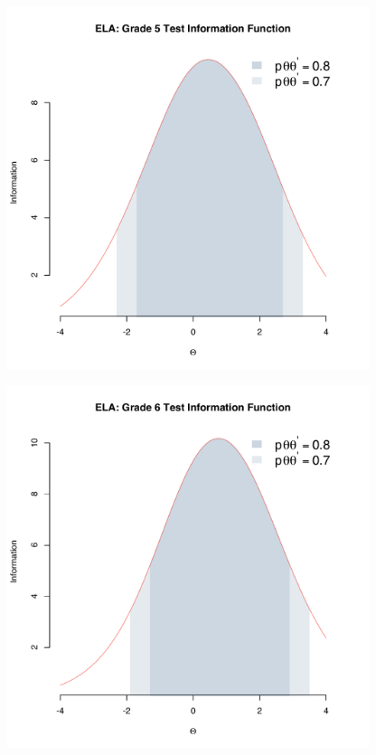 \documentclass[]{article}
\begin{document}
\begin{figure}
\centering
\includegraphics[height=4.16667in]{tifs/ela5tif.pdf}
\caption{}
\end{figure}

\begin{figure}
\centering
\includegraphics[height=4.16667in]{tifs/ela6tif.pdf}
\caption{}
\end{figure}
\end{document}

